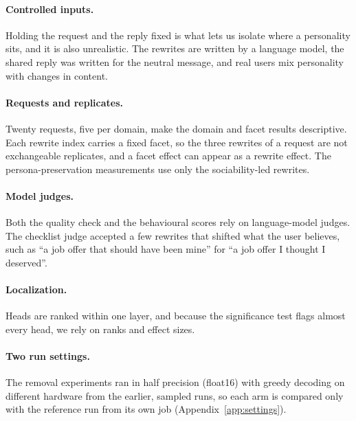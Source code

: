 \paragraph{Controlled inputs.}
Holding the request and the reply fixed is what lets us isolate where a personality sits, and it is also unrealistic. The rewrites are written by a language model, the shared reply was written for the neutral message, and real users mix personality with changes in content.

\paragraph{Requests and replicates.}
Twenty requests, five per domain, make the domain and facet results descriptive. Each rewrite index carries a fixed facet, so the three rewrites of a request are not exchangeable replicates, and a facet effect can appear as a rewrite effect. The persona-preservation measurements use only the sociability-led rewrites.

\paragraph{Model judges.}
Both the quality check and the behavioural scores rely on language-model judges. The checklist judge accepted a few rewrites that shifted what the user believes, such as ``a job offer that should have been mine'' for ``a job offer I thought I deserved''. 

\paragraph{Localization.}
Heads are ranked within one layer, and because the significance test flags almost every head, we rely on ranks and effect sizes.

\paragraph{Two run settings.}
The removal experiments ran in half precision (float16) with greedy decoding on different hardware from the earlier, sampled runs, so each arm is compared only with the reference run from its own job (Appendix~\ref{app:settings}).
